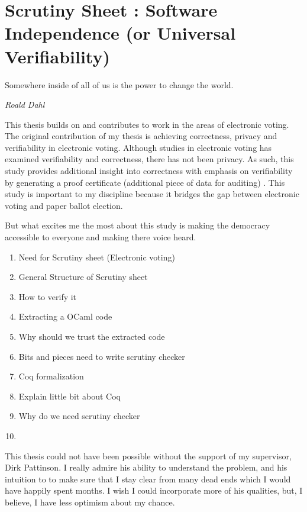 \chapter{Scrutiny Sheet : Software Independence (or Universal Verifiability)}
\label{cha:software_independence}

\epigraph{Somewhere inside of all of us is the power to change the world.} 
{\textit{Roald Dahl }}


This thesis builds on and contributes to work in the areas of electronic voting. 
The original contribution of my thesis is achieving correctness, privacy and verifiability in 
electronic voting. Although studies in electronic voting has examined verifiability and correctness, 
there has not been privacy.   As such, this study provides additional insight into correctness with 
emphasis on verifiability by generating a proof certificate (additional piece of data for auditing) . 
This study is important to my discipline because it bridges the gap between electronic voting 
and paper ballot election. 

But what excites me the most about this study is making the democracy accessible to everyone
and making there voice heard. 

\begin{enumerate}
\item Need for Scrutiny sheet (Electronic voting)
\item General Structure of Scrutiny sheet
\item How to verify it
\item Extracting a OCaml code
\item Why should we trust the extracted code
\item Bits and pieces need to write scrutiny checker
\item Coq formalization
\item Explain little bit about Coq
\item Why do we need scrutiny checker
\item 
\end{enumerate}



This thesis could not have been possible without the support of my supervisor, Dirk Pattinson. I really admire
 his ability to understand the problem, and his intuition to to make sure that I stay clear from many dead ends 
 which I would have happily spent months. I wish I could incorporate more of his qualities, but, I believe, I have
 less optimism about my chance. 
 
